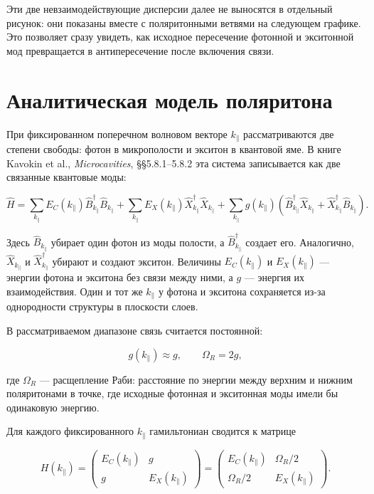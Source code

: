 \documentclass[12pt,a4paper]{article}
\begin{document}
Эти две невзаимодействующие дисперсии далее не выносятся в отдельный рисунок: они показаны вместе с поляритонными ветвями на следующем графике. Это позволяет сразу увидеть, как исходное пересечение фотонной и экситонной мод превращается в антипересечение после включения связи.


\clearpage
\section{Аналитическая модель поляритона}

При фиксированном поперечном волновом векторе $k_\parallel$ рассматриваются две степени свободы: фотон в микрополости и экситон в квантовой яме. В книге Kavokin et al., \textit{Microcavities}, \S\S5.8.1--5.8.2 эта система записывается как две связанные квантовые моды:

\[
\hat H
=
\sum_{k_\parallel}
E_C(k_\parallel)\hat B_{k_\parallel}^{\dagger}\hat B_{k_\parallel}
+
\sum_{k_\parallel}
E_X(k_\parallel)\hat X_{k_\parallel}^{\dagger}\hat X_{k_\parallel}
+
\sum_{k_\parallel}
g(k_\parallel)
\left(
\hat B_{k_\parallel}^{\dagger}\hat X_{k_\parallel}
+
\hat X_{k_\parallel}^{\dagger}\hat B_{k_\parallel}
\right).
\]

Здесь $\hat B_{k_\parallel}$ убирает один фотон из моды полости, а $\hat B_{k_\parallel}^{\dagger}$ создает его. Аналогично, $\hat X_{k_\parallel}$ и $\hat X_{k_\parallel}^{\dagger}$ убирают и создают экситон. Величины $E_C(k_\parallel)$ и $E_X(k_\parallel)$ --- энергии фотона и экситона без связи между ними, а $g$ --- энергия их взаимодействия. Один и тот же $k_\parallel$ у фотона и экситона сохраняется из-за однородности структуры в плоскости слоев.

В рассматриваемом диапазоне связь считается постоянной:

\[
g(k_\parallel)\approx g,
\qquad
\Omega_R=2g,
\]

где $\Omega_R$ --- расщепление Раби: расстояние по энергии между верхним и нижним поляритонами в точке, где исходные фотонная и экситонная моды имели бы одинаковую энергию.

Для каждого фиксированного $k_\parallel$ гамильтониан сводится к матрице

\[
H(k_\parallel)=
\begin{pmatrix}
E_C(k_\parallel) & g\\
g & E_X(k_\parallel)
\end{pmatrix}
=
\begin{pmatrix}
E_C(k_\parallel) & \Omega_R/2\\
\Omega_R/2 & E_X(k_\parallel)
\end{pmatrix}.
\]
\end{document}
